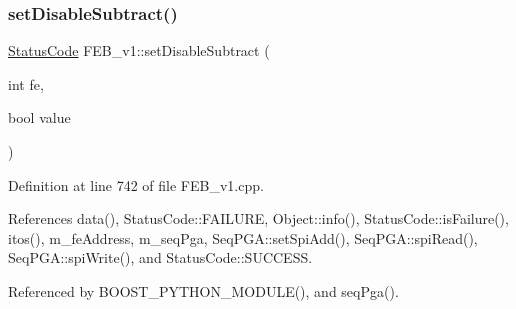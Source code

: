 \mbox{\label{classFEB__v1_a067a0aeae34dbd782547afbcd82fc77f}} 
\subsubsection{\texorpdfstring{set\+Disable\+Subtract()}{setDisableSubtract()}}
{\footnotesize\ttfamily \hyperlink{classStatusCode}{Status\+Code} F\+E\+B\+\_\+v1\+::set\+Disable\+Subtract (\begin{DoxyParamCaption}\item[{int}]{fe,  }\item[{bool}]{value }\end{DoxyParamCaption})}



Definition at line 742 of file F\+E\+B\+\_\+v1.\+cpp.



References data(), Status\+Code\+::\+F\+A\+I\+L\+U\+RE, Object\+::info(), Status\+Code\+::is\+Failure(), itos(), m\+\_\+fe\+Address, m\+\_\+seq\+Pga, Seq\+P\+G\+A\+::set\+Spi\+Add(), Seq\+P\+G\+A\+::spi\+Read(), Seq\+P\+G\+A\+::spi\+Write(), and Status\+Code\+::\+S\+U\+C\+C\+E\+SS.



Referenced by B\+O\+O\+S\+T\+\_\+\+P\+Y\+T\+H\+O\+N\+\_\+\+M\+O\+D\+U\+L\+E(), and seq\+Pga().


